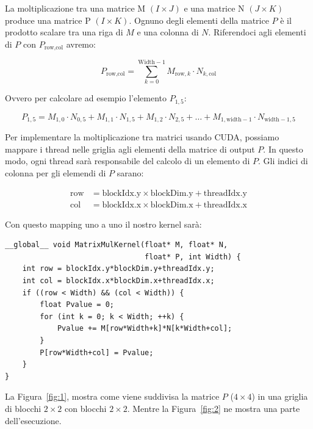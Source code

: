 \documentclass[a4paper]{article}
\begin{document}
La moltiplicazione tra una matrice M $(I\times{J})$ e una matrice N $(J\times{K})$ produce una matrice P $(I\times{K})$. Ognuno degli elementi della matrice $P$ è il prodotto scalare tra una riga di $M$ e una colonna di $N$. Riferendoci agli elementi di $P$ con $P_{\text{row}, \text{col}}$ avremo:

\[
    P_{\text{row}, \text{col}} = \sum_{k=0}^{\text{Width}-1} M_{\text{row}, k} \cdot N_{k, \text{col}}
\]

Ovvero per calcolare ad esempio l'elemento $P_{1, 5}$:

\[
    P_{1,5} = M_{1,0} \cdot N_{0,5} + M_{1,1} \cdot N_{1,5} + M_{1,2} \cdot N_{2,5} + \ldots + M_{1,\text{width}-1} \cdot N_{\text{width}-1,5}
\]

Per implementare la moltiplicazione tra matrici usando CUDA, possiamo mappare i thread nelle griglia agli elementi della matrice di output $P$. In questo modo, ogni thread sarà responsabile del calcolo di un elemento di $P$. Gli indici di colonna per gli elemendi di $P$ sarano:

\[
    \begin{aligned}
        \text{row} & = \text{blockIdx.y} \times \text{blockDim.y} + \text{threadIdx.y} \\
        \text{col} & = \text{blockIdx.x} \times \text{blockDim.x} + \text{threadIdx.x}
    \end{aligned}
\]

Con questo mapping uno a uno il nostro kernel sarà:

\begin{lstlisting}[caption={Kernel CUDA con memoria globale}, label={lst:1}]
__global__ void MatrixMulKernel(float* M, float* N,
                                float* P, int Width) {
    int row = blockIdx.y*blockDim.y+threadIdx.y;
    int col = blockIdx.x*blockDim.x+threadIdx.x;
    if ((row < Width) && (col < Width)) {
        float Pvalue = 0;
        for (int k = 0; k < Width; ++k) {
            Pvalue += M[row*Width+k]*N[k*Width+col];
        }
        P[row*Width+col] = Pvalue;
    }
}
\end{lstlisting}

\newpage

La Figura~\ref{fig:1}, mostra come viene suddivisa la matrice $P$ ($4\times{4}$) in una griglia di blocchi $2\times{2}$ con blocchi $2\times{2}$. Mentre la Figura~\ref{fig:2} ne mostra una parte dell'esecuzione.
\end{document}
